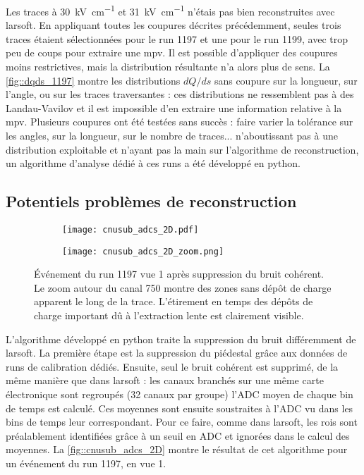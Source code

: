     Les traces à \SI{30}{\kilo\volt\per\centi\meter} et \SI{31}{\kilo\volt\per\centi\meter} n'étais pas bien reconstruites avec \gls{larsoft}. En appliquant toutes les coupures décrites précédemment, seules trois traces étaient sélectionnées pour le run 1197 et une pour le run 1199, avec trop peu de coups pour extraire une \gls{mpv}. Il est possible d'appliquer des coupures moins restrictives, mais la distribution résultante n'a alors plus de sens. La \autoref{fig::dqds_1197} montre les distributions $dQ/ds$ sans coupure sur la longueur, sur l'angle, ou sur les traces traversantes : ces distributions ne ressemblent pas à des Landau-Vavilov et il est impossible d'en extraire une information relative à la \gls{mpv}. Plusieurs coupures ont été testées sans succès : faire varier la tolérance sur les angles, sur la longueur, sur le nombre de traces... n'aboutissant pas à une distribution exploitable et n'ayant pas la main sur l'algorithme de reconstruction, un algorithme d'analyse dédié à ces runs a été développé en python.

    \subsection{Potentiels problèmes de reconstruction}

      \begin{figure}[htbp]
        \centering
        \begin{subfigure}[t]{0.8\textwidth}
          \centering
          \texttt{[image: cnusub\_adcs\_2D.pdf]}
        \end{subfigure}\hfill
        \begin{subfigure}[t]{0.19\textwidth}
          \centering
          \texttt{[image: cnusub\_adcs\_2D\_zoom.png]}
        \end{subfigure}
        \caption[Événement du run 1197 vue 1 après suppression du bruit cohérent]{\label{fig::cnusub_adcs_2D}Événement du run 1197 vue 1 après suppression du bruit cohérent. Le zoom autour du canal 750 montre des zones sans dépôt de charge apparent le long de la trace. L'étirement en temps des dépôts de charge important dû à l'extraction lente est clairement visible.}
      \end{figure}

      L'algorithme développé en python traite la suppression du bruit différemment de \gls{larsoft}. La première étape est la suppression du piédestal grâce aux données de runs de calibration dédiés. Ensuite, seul le bruit cohérent est supprimé, de la même manière que dans \gls{larsoft} : les canaux branchés sur une même carte électronique sont regroupés (32 canaux par groupe) l'ADC moyen de chaque bin de temps est calculé. Ces moyennes sont ensuite soustraites à l'ADC vu dans les bins de temps leur correspondant. Pour ce faire, comme dans \gls{larsoft}, les \glspl{roi} sont préalablement identifiées grâce à un seuil en ADC et ignorées dans le calcul des moyennes. La \autoref{fig::cnusub_adcs_2D} montre le résultat de cet algorithme pour un événement du run 1197, en vue 1.

